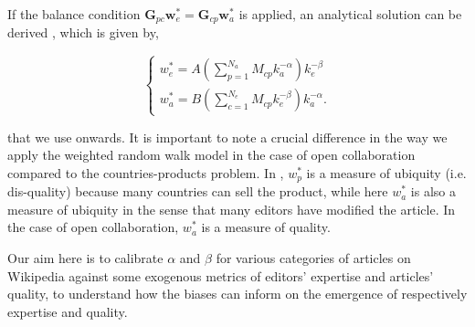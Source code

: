 If the balance condition $\mathbf{G}_{pc} \mathbf{w}^*_e = \mathbf{G}_{cp} \mathbf{w}^*_a$
is applied, an analytical solution can be derived \cite{caldarelli}, which is given by,

\begin{equation}
\begin{cases}
 w^*_e = A(\sum^{N_a}_{p=1} M_{cp}k_a^{-\alpha})k_e^{-\beta} \\
w^*_a = B(\sum^{N_e}_{c=1} M_{cp}k_e^{-\beta})k_a^{-\alpha}.
\end{cases}
\end{equation}



that we use onwards. It is important to note a crucial difference in the way we apply the weighted random walk model in the case of open collaboration compared to the countries-products problem. In \cite{caldarelli2012network}, $w^*_p$ is a measure of ubiquity (i.e. dis-quality) because many countries can sell the product, while here $w^*_a$ is also a measure of ubiquity in the sense that many editors have modified the article. In the case of open collaboration, $w^*_a$ is a measure of quality.

Our aim here is to calibrate $\alpha$ and $\beta$ for various categories of articles on Wikipedia against some exogenous metrics of editors' expertise and articles' quality, to understand how the biases can inform on the emergence of respectively expertise and quality.

